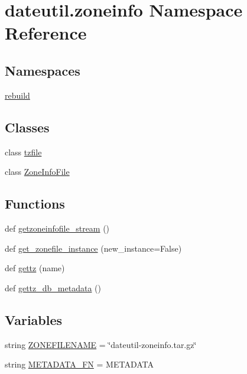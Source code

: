 \hypertarget{namespacedateutil_1_1zoneinfo}{}\section{dateutil.\+zoneinfo Namespace Reference}
\label{namespacedateutil_1_1zoneinfo}
\subsection*{Namespaces}
\begin{DoxyCompactItemize}
\item 
 \hyperlink{namespacedateutil_1_1zoneinfo_1_1rebuild}{rebuild}
\end{DoxyCompactItemize}
\subsection*{Classes}
\begin{DoxyCompactItemize}
\item 
class \hyperlink{classdateutil_1_1zoneinfo_1_1tzfile}{tzfile}
\item 
class \hyperlink{classdateutil_1_1zoneinfo_1_1ZoneInfoFile}{Zone\+Info\+File}
\end{DoxyCompactItemize}
\subsection*{Functions}
\begin{DoxyCompactItemize}
\item 
def \hyperlink{namespacedateutil_1_1zoneinfo_a627f3aa7152a10ca0c6454808b86dce7}{getzoneinfofile\+\_\+stream} ()
\item 
def \hyperlink{namespacedateutil_1_1zoneinfo_a75c4f3206fb4ce7cac96842fbcec71ea}{get\+\_\+zonefile\+\_\+instance} (new\+\_\+instance=False)
\item 
def \hyperlink{namespacedateutil_1_1zoneinfo_ad0d7307684458e5d285cbff60c1e2617}{gettz} (name)
\item 
def \hyperlink{namespacedateutil_1_1zoneinfo_a813fb88c7ca8197be2f9753e04b552ba}{gettz\+\_\+db\+\_\+metadata} ()
\end{DoxyCompactItemize}
\subsection*{Variables}
\begin{DoxyCompactItemize}
\item 
string \hyperlink{namespacedateutil_1_1zoneinfo_af9a208789900d247feebe0cc8f89a716}{Z\+O\+N\+E\+F\+I\+L\+E\+N\+A\+ME} = \char`\"{}dateutil-\/zoneinfo.\+tar.\+gz\char`\"{}
\item 
string \hyperlink{namespacedateutil_1_1zoneinfo_a8fb7f83d54e56ffadaaa88c17f564453}{M\+E\+T\+A\+D\+A\+T\+A\+\_\+\+FN} = \textquotesingle{}M\+E\+T\+A\+D\+A\+TA\textquotesingle{}
\end{DoxyCompactItemize}


